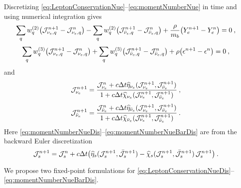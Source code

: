 \documentclass[12pt]{article}
\def\Ne{{\nu_{e}}}
\def\ANe{{\bar{\nu}_{e}}}
\begin{document}
Discretizing \eqref{eq:LeptonConservationNue}--\eqref{eq:momentNumberNue} in time and using numerical integration gives
\begin{equation}\label{eq:LeptonConservationNueDis}
   \sum_{q} w^{(2)}_q \big(\cJ_{\Ne,q}^{n+1} - \cJ_{\Ne,q}^{n}\big)
 - \sum_{q} w^{(2)}_q \big(\cJ_{\ANe,q}^{n+1} - \cJ_{\ANe,q}^{n}\big)
 + \f{\rho}{m_{b}} \big(Y_{e}^{n+1} - Y_{e}^{n} \big) = 0\:,
\end{equation}
\begin{equation}\label{eq:EnergyConservationNueDis}
   \sum_{q} w^{(3)}_q \big(\cJ_{\Ne,q}^{n+1} - \cJ_{\Ne,q}^{n}\big)
 + \sum_{q} w^{(3)}_q \big(\cJ_{\ANe,q}^{n+1} - \cJ_{\ANe,q}^{n}\big)
 + \rho \big(\epsilon^{n+1} - \epsilon^{n} \big) = 0\:,
\end{equation}
and
\begin{equation}\label{eq:momentNumberNueDis}
  \cJ_{\Ne}^{n+1} = \f{\cJ_{\Ne}^{n} + c\dt \widehat{\eta}_{\Ne}(\cJ_{\Ne}^{n+1},\cJ_{\ANe}^{n+1})}{1 + c\dt\widehat{\chi}_{\Ne}(\cJ_{\Ne}^{n+1},\cJ_{\ANe}^{n+1})}\:,
\end{equation}
\begin{equation}\label{eq:momentNumberNueBarDis}
  \cJ_{\ANe}^{n+1} = \f{\cJ_{\ANe}^{n} + c\dt \widehat{\eta}_{\ANe}(\cJ_{\Ne}^{n+1},\cJ_{\ANe}^{n+1})}{1 + c\dt\widehat{\chi}_{\ANe}(\cJ_{\Ne}^{n+1},\cJ_{\ANe}^{n+1})}\:.
\end{equation}
Here \eqref{eq:momentNumberNueDis}--\eqref{eq:momentNumberNueBarDis} are from the backward Euler discretization
\begin{equation}
  \mathcal{J}_{s}^{n+1} = \mathcal{J}_{s}^{n} + c\Delta t \big(\widehat{\eta}_{s}(\mathcal{J}_{s}^{n+1},\bar{\mathcal{J}}_{s}^{n+1}) - \widehat{\chi}_{s}(\mathcal{J}_{s}^{n+1},\bar{\mathcal{J}}_{s}^{n+1})\,\mathcal{J}_{s}^{n+1}\big)\:.
\end{equation}


We propose two fixed-point formulations for \eqref{eq:LeptonConservationNueDis}--\eqref{eq:momentNumberNueBarDis}.
\end{document}
